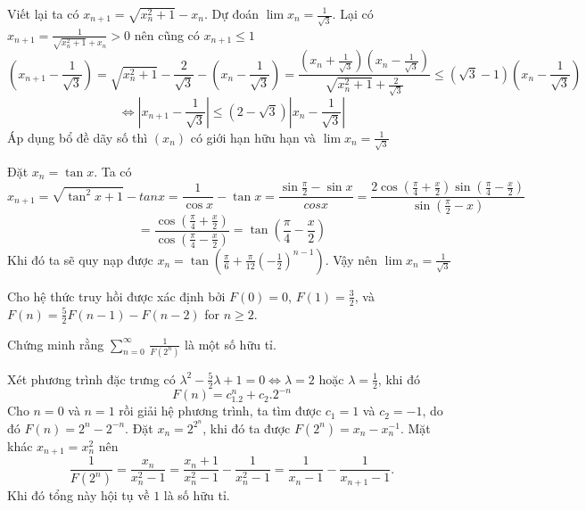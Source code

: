 \documentclass[11pt]{scrartcl}
\begin{document}
\begin{itemize}[label=, leftmargin=0em, itemsep=0.5em]
    \begin{sol}
         Viết lại ta có $x_{n + 1} = \sqrt{x_n^2 + 1} - x_n$. Dự đoán $\lim x_n = \frac{1}{\sqrt{3}}$. Lại có 
        $x_{n + 1} = \frac{1}{\sqrt{x_n^2 + 1} + x_n} > 0$ nên cũng có $x_{n+ 1} \leq 1$
        \[(x_{n + 1} - \frac{1}{\sqrt{3}}) = \sqrt{x_n^2 + 1} - \frac{2}{\sqrt{3}} - (x_n - \frac{1}{\sqrt{3}}) = \frac{(x_n + \frac{1}{\sqrt{3}})(x_n - \frac{1}{\sqrt{3}})}{\sqrt{x_n^2 + 1} + \frac{2}{\sqrt{3}}} \leq (\sqrt{3} - 1)(x_n - \frac{1}{\sqrt{3}})
        \]
        \[\Leftrightarrow |x_{n + 1} - \frac{1}{\sqrt{3}}| \leq (2 - \sqrt{3})|x_n - \frac{1}{\sqrt{3}}|\]
        Áp dụng bổ đề dãy số thì $(x_n)$ có giới hạn hữu hạn và $\lim x_n = \frac{1}{\sqrt{3}}$ 


         Đặt $x_n = \tan{x}$. Ta có 
        \[x_{ n + 1} = \sqrt{\tan^2{x} + 1} - tan{x} = \frac{1}{\cos x} - \tan{x} = \frac{\sin{\frac{\pi}{2}} - \sin{x}}{cos{x}} = \frac{2\cos(\frac{\pi}{4} + \frac{x}{2})\sin(\frac{\pi}{4} -\frac{x}{2})}{\sin(\frac{\pi}{2} - x)}\]
        \[
        = \frac{\cos(\frac{\pi}{4} + \frac{x}{2})}{\cos(\frac{\pi}{4} - \frac{x}{2})} = \tan(\frac{\pi}{4} - \frac{x}{2})
        \]
        Khi đó ta sẽ quy nạp được $x_n = \tan\left(\frac{\pi}{6} + \frac{\pi}{12}\left(-\frac{1}{2}\right)^{n - 1}\right)$. Vậy nên $\lim x_n = \frac{1}{\sqrt{3}}$
    \end{sol}
    \begin{bt}
    Cho hệ thức truy hồi được xác định bởi $F(0)=0$, $F(1)=\frac32$, và $F(n)=\frac{5}{2}F(n-1)-F(n-2)$
    for $n\ge2$.
    
    Chứng minh rằng $\displaystyle{\sum_{n=0}^{\infty}\,
        \frac{1}{F(2^n)}}$ là một số hữu tỉ.
    \end{bt}

    \begin{sol}
        Xét phương trình đặc trưng có $\lambda^2 - \frac{5}{2}\lambda + 1 = 0 \Leftrightarrow \lambda = 2$ hoặc $\lambda = \frac{1}{2}$, khi đó 
        \[
            F(n) = c_1.2^n + c_2. 2^{-n}
        \]
        Cho $n = 0$ và $n = 1$ rồi giải hệ phương trình, ta tìm được $c_1 = 1$ và $c_2 = -1$, do đó $F(n) = 2^n - 2^{-n}$. Đặt $x_n = 2^{2^n}$, khi đó ta được $F(2^n) = x_n - x_n^{-1}$. Mặt khác $x_{n + 1} = x_n^2$ nên
        \[
            \frac{1}{F(2^n)} = \frac{x_n}{x_n^2-1} = \frac{x_n+1}{x_n^2-1}-\frac{1}{x_n^2-1} = \frac{1}{x_n-1}-\frac{1}{x_{n+1}-1}.
        \]
        Khi đó tổng này hội tụ về $1$ là số hữu tỉ.
    \end{sol}


\end{itemize}
\end{document}
